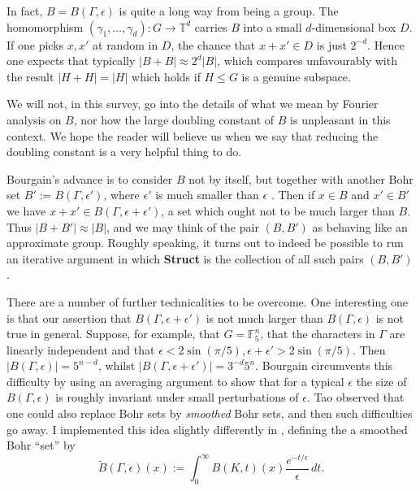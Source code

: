 \documentclass[12pt,a4paper,reqno]{amsart}
\numberwithin{equation}{section}
\theoremstyle{plain}
\theoremstyle{definition}
\renewcommand{\leq}{\leqslant}
\begin{document}
\noindent In fact, $B = B(\Gamma,\epsilon)$ is quite a long way from being a group. The homomorphism $(\gamma_1,\dots,\gamma_d) : G \rightarrow \mathbb{T}^d$ carries $B$ into a small $d$-dimensional box $D$. If one picks $x,x'$ at random in $D$, the chance that $x + x' \in D$ is just $2^{-d}$. Hence one expects that typically $|B + B| \approx 2^{d}|B|$, which compares unfavourably with the result $|H + H| = |H|$ which holds if $H \leq G$ is a genuine subspace.\vspace{11pt}

\noindent We will not, in this survey, go into the details of what we mean by Fourier analysis on $B$, nor how the large doubling constant of $B$ is unpleasant in this context. We hope the reader will believe us when we say that reducing the doubling constant is a very helpful thing to do.\vspace{11pt}

\noindent Bourgain's advance is to consider $B$ not by itself, but together with another Bohr set $B' := B(\Gamma,\epsilon')$, where $\epsilon'$ is much smaller than $\epsilon$ . Then if $x \in B$ and $x' \in B'$ we have $x + x' \in B(\Gamma,\epsilon + \epsilon')$, a set which ought not to be much larger than $B$. Thus $|B + B'| \approx |B|$, and we may think of the pair $(B,B')$ as behaving like an approximate group. Roughly speaking, it turns out to indeed be possible to run an iterative argument in which \textbf{Struct} is the collection of all such pairs $(B,B')$.\vspace{11pt}

\noindent There are a number of further technicalities to be overcome. One interesting one is that our assertion that $B(\Gamma,\epsilon + \epsilon')$ is not much larger than $B(\Gamma,\epsilon)$ is not true in general. Suppose, for example, that $G = \mathbb{F}_5^n$, that the characters in $\Gamma$ are linearly independent and that $\epsilon < 2\sin (\pi/5), \epsilon + \epsilon' > 2\sin(\pi/5)$. Then $|B(\Gamma,\epsilon)| = 5^{n - d}$, whilst $|B(\Gamma,\epsilon + \epsilon')| = 3^{-d}5^n$. Bourgain circumvents this difficulty by using an averaging argument to show that for a typical $\epsilon$ the size of $B(\Gamma,\epsilon)$ is roughly invariant under small perturbations of $\epsilon$. Tao \cite{tao-notes} observed that one could also replace Bohr sets by \textit{smoothed} Bohr sets, and then such difficulties go away. I implemented this idea slightly differently in \cite{green-reg}, defining the a smoothed Bohr ``set'' by
\[ \widetilde{B}(\Gamma,\epsilon)(x) := \int^{\infty}_0 B(K,t)(x) \frac{e^{-t/\epsilon}}{\epsilon} \, dt.\]
\end{document}
